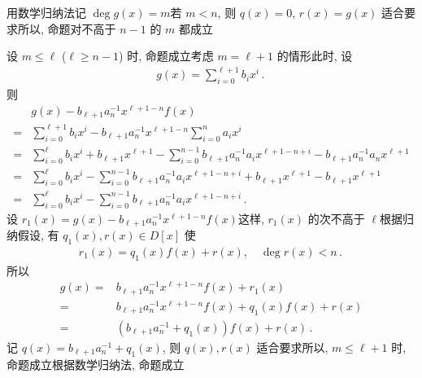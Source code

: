 \begin{pf}
    用数学归纳法\period 记 $\deg g(x) = m$\period 若 $m<n$, 则 $q(x) = 0$, $r(x) = g(x)$ 适合要求\period 所以, 命题对不高于 $n-1$ 的 $m$ 都成立\period

    设 $m \leq \ell$ ($\ell \geq n-1$) 时, 命题成立\period 考虑 $m=\ell+1$ 的情形\period 此时, 设
    \begin{align*}
        g(x) = \sum_{i = 0}^{\ell + 1} b_i x^i \period
    \end{align*}
    则
    \begin{align*}
             & g(x) - b_{\ell+1} a_n^{-1} x^{\ell+1-n} f(x)                                                                                                         \\
        = {} & \sum_{i = 0}^{\ell+1} b_i x^i - b_{\ell+1} a_n^{-1} x^{\ell+1-n} \sum_{i = 0}^{n} a_i x^i                                                            \\
        = {} & \sum_{i = 0}^{\ell} b_i x^i + b_{\ell+1} x^{\ell+1} - \sum_{i = 0}^{n-1} b_{\ell+1} a_n^{-1} a_i x^{\ell+1-n+i} - b_{\ell+1} a_n^{-1} a_n x^{\ell+1} \\
        = {} & \sum_{i = 0}^{\ell} b_i x^i  - \sum_{i = 0}^{n-1} b_{\ell+1} a_n^{-1} a_i x^{\ell+1-n+i} + b_{\ell+1} x^{\ell+1} - b_{\ell+1} x^{\ell+1}             \\
        = {} & \sum_{i = 0}^{\ell} b_i x^i  - \sum_{i = 0}^{n-1} b_{\ell+1} a_n^{-1} a_i x^{\ell+1-n+i}\period
    \end{align*}
    设 $r_1 (x) = g(x) - b_{\ell+1} a_n^{-1} x^{\ell+1-n} f(x)$\period 这样, $r_1 (x)$ 的次不高于 $\ell$\period 根据归纳假设, 有 $q_1 (x), r(x) \in D[x]$ 使
    \begin{align*}
        r_1 (x) = q_1 (x) f(x) + r(x), \quad \deg r(x) < n \period
    \end{align*}
    所以
    \begin{align*}
        g(x)
        = {} & b_{\ell+1} a_n^{-1} x^{\ell+1-n} f(x) + r_1 (x)             \\
        = {} & b_{\ell+1} a_n^{-1} x^{\ell+1-n} f(x) + q_1 (x) f(x) + r(x) \\
        = {} & (b_{\ell+1} a_n^{-1} + q_1 (x)) f(x) + r(x) \period
    \end{align*}
    记 $q(x) = b_{\ell+1} a_n^{-1} + q_1 (x)$, 则 $q(x), r(x)$ 适合要求\period 所以, $m \leq \ell + 1$ 时, 命题成立\period 根据数学归纳法, 命题成立\period
\end{pf}

